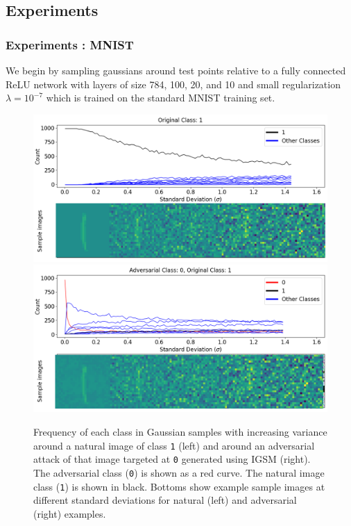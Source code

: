\subsection{Experiments}
\begin{frame}
  \frametitle{Experiments : MNIST}
   We begin by sampling gaussians around test points relative to a fully connected ReLU network with layers of size
   784, 100, 20, and 10 and small regularization $\lambda = 10^{-7}$
   which is trained on the standard MNIST training set. \\


 \begin{figure}[!ht]
   \includegraphics[width = .49\textwidth]{c3_figures/MNIST1.png}
   \includegraphics[width = .49\textwidth]{c3_figures/MNIST10.png}
 \caption{Frequency of each class in Gaussian samples with increasing variance around a natural image of class \texttt{1} (left) and around an adversarial attack of that image targeted at \texttt{0} generated using IGSM (right). The adversarial class (\texttt{0}) is shown as a red curve. The natural image class (\texttt{1}) is shown in black. Bottoms show example sample images at different standard deviations for natural (left) and adversarial (right) examples.}\label{fgsmo}
\end{figure}
\end{frame}

